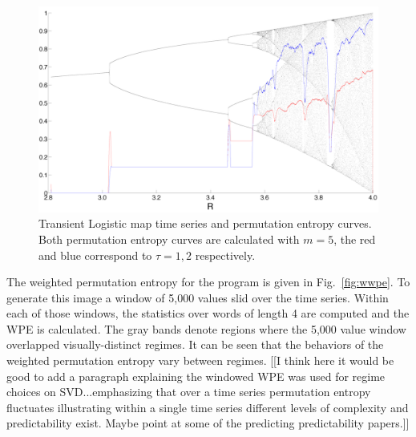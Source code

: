 \begin{figure}[ht]
  \centering
  \includegraphics[width=\columnwidth]{unused-figs/tstranslog-perm}
  \caption{Transient Logistic map time series and permutation entropy curves. Both permutation entropy curves are calculated with $m=5$, the red and blue correspond to $\tau = 1,2$ respectively.}
  \label{fig:translogistic}
\end{figure}



The weighted permutation entropy for the \svd program is given in
Fig.~\ref{fig:wwpe}. To generate this image a window of 5,000 values slid over
the time series. Within each of those windows, the statistics over words of
length 4 are computed and the WPE is calculated. The gray bands denote regions
where the 5,000 value window overlapped visually-distinct regimes. It can be
seen that the behaviors of the weighted permutation entropy vary between
regimes. [[I think here it would be good to add a paragraph explaining the windowed WPE was used for regime choices on SVD...emphasizing  that over a time series permutation entropy fluctuates illustrating within a single time series different levels of complexity and predictability exist. Maybe point at some of the predicting predictability papers.]]



